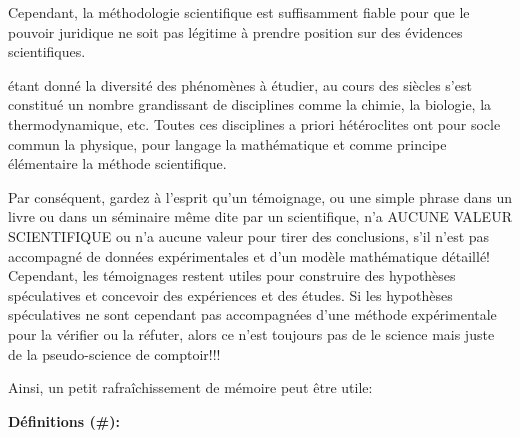 	\begin{center}
	\end{center}
	Cependant, la m\'ethodologie scientifique est suffisamment fiable pour que le pouvoir juridique ne soit pas l\'egitime à prendre position sur des \'evidences scientifiques.

	\'etant donn\'e la diversit\'e des ph\'enomènes à \'etudier, au cours des siècles s'est constitu\'e un nombre grandissant de disciplines comme la chimie, la biologie, la thermodynamique, etc. Toutes ces disciplines a priori h\'et\'eroclites ont pour socle commun la physique, pour langage la math\'ematique et comme principe \'el\'ementaire la m\'ethode scientifique.
	\begin{tcolorbox}[title=Remarque,colframe=black,arc=10pt]
	Par cons\'equent, gardez à l'esprit qu'un t\'emoignage, ou une simple phrase dans un livre ou dans un s\'eminaire même dite par un scientifique, n'a AUCUNE VALEUR SCIENTIFIQUE ou n'a aucune valeur pour tirer des conclusions, s'il n'est pas accompagn\'e de donn\'ees exp\'erimentales et d'un modèle math\'ematique d\'etaill\'e! Cependant, les t\'emoignages restent utiles pour construire des hypothèses sp\'eculatives et concevoir des exp\'eriences et des \'etudes. Si les hypothèses sp\'eculatives ne sont cependant pas accompagn\'ees d'une m\'ethode exp\'erimentale pour la v\'erifier ou la r\'efuter, alors ce n'est toujours pas de le science mais juste de la pseudo-science de comptoir!!!
	\end{tcolorbox}
	Ainsi, un petit rafraîchissement de m\'emoire peut être utile:

	\textbf{D\'efinitions (\#\mydef):}
	
